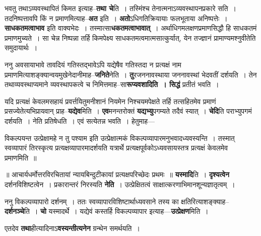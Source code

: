 \documentclass[article,12pt,a4paper]{memoir}
\begin{document}
	  \pstart भवतु तथाऽव्यवस्थापितं किमत इत्याह--\textbf{तथा चे}ति । तस्मिंश्च तेनात्मनाऽव्यवस्थापनप्रकारे सति । तदनिष्पत्तावपि किं न प्रमाणमित्याह--\textbf{अत} इति । \textbf{अतो}ऽधिगतिक्रियायाः फलभूताया अनिष्पत्तेः । \textbf{साधकतमत्वाभाव} इति वाक्यभेदः । तस्मात्सा\textbf{धकतमत्वाभावात्} । अर्थाधिगमलक्षणप्रमाणसिद्धौ हि साधकतमं प्रमाणमुच्यते । सा चेन्न निष्पन्ना तर्हि किमपेक्ष्य साधकतमत्वमात्मसात्कुर्यात्, येन तज्ज्ञानं प्रामाण्यमश्नुवीतेति समुदायार्थः ।
	\pend
      

	  \pstart ननु अवसायाभावे तावदियं गतिस्तद्भावेऽपि यद्येषैव गतिस्तदा न प्रत्यक्षं नाम प्रमाणमित्याशङ्क्यान्वयमुखेनेदानीमाह--\textbf{जनिते}नेति । \textbf{तु}रजननावस्थाया जननावस्थां भेदवतीं दर्शयति । तेन तथाव्यवस्थाप्यमाने व्यवस्थापकत्वे च निमित्तमाह--सा\textbf{रूप्यवशादिति । सिद्धं} प्रतीतं भवति ।
	\pend
      

	  \pstart यदि प्रत्यक्षं केवलमसहायं प्रवर्त्तयितुमनीशानं नियमेन निश्चयमपेक्षते तर्हि तत्सहितमेव प्रमाणं प्रसज्येतेत्यभिप्रायवान् प्राह--\textbf{यद्येव}मिति । \textbf{एव}मनन्तरोक्तं \textbf{यद्यभ्यु}पगम्यते तदैवं स्यात् । \textbf{चेदि}ति पराभ्युपगमं दर्शयति । नेति प्रतिषेधति । एवं सत्येतन्न भवति । हेतुमाह—  \leavevmode{} 
	  
	विकल्पयन्त उत्प्रेक्षामहे न तु पश्याम इति उत्प्रेक्षात्मकं विकल्पव्यापारमनुभवादध्यवस्यन्ति । तस्मात् स्वव्यापारं तिरस्कृत्य प्रत्यक्षव्यापारमादर्शयति यत्रार्थे प्रत्यक्षपूर्वकोऽध्यवसायस्तत्र प्रत्यक्षं केवलमेव प्रमाणमिति ॥  
	  
	॥ आचार्यधर्मोत्तरविरचितायां न्यायबिन्दुटीकायां प्रत्यक्षपरिच्छेदः प्रथमः ॥ \textbf{यस्मादि}ति । \textbf{दृश्यत्वेन} दर्शनविशिष्टत्वेन । प्रकारान्तरं निरस्यति \textbf{नेति} । उत्प्रेक्षितत्वं साक्षात्करणाभिमानशून्यज्ञातृत्वम् ।
	\pend
      

	  \pstart ननु विकल्पव्यापारो दर्शनम् । ततः स्वव्यापारविशिष्टार्थाध्यवसाने तस्य का क्षतिरित्याशङ्क्याह--\textbf{दर्शनञ्चे}ति । \textbf{चो} यस्मादर्थे । यद्येवं कस्तर्हि विकल्पव्यापार इत्याह—\textbf{उत्प्रेक्षण}मिति ।
	\pend
      

	  \pstart एतदेव \textbf{तथा}हीत्यादिनाऽ\textbf{वस्यन्तीत्यनेन} ग्रन्थेन समर्थयति ।
	\pend
      
\end{document}
